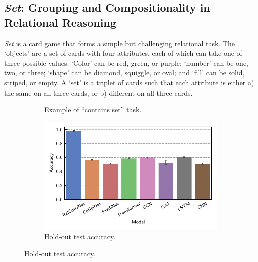\subsection{\textit{Set}: Grouping and Compositionality in Relational Reasoning}\label{ssec:experiments_set}

\textit{Set} is a card game that forms a simple but challenging relational task. The `objects' are a set of cards with four attributes, each of which can take one of three possible values. `Color' can be red, green, or purple; `number' can be one, two, or three; `shape' can be diamond, squiggle, or oval; and `fill' can be solid, striped, or empty. A `set' is a triplet of cards such that each attribute is either a) the same on all three cards, or b) different on all three cards.

\begin{figure}[ht]
    \vskip-10pt
    \centering
    \begin{subfigure}[b]{0.49\textwidth}
        \centering
        \caption{Example of ``contains set'' task.}\label{fig:contains_set_example}
    \end{subfigure}
    \begin{subfigure}[b]{0.5\textwidth}
        \centering
        \includegraphics[width=\textwidth]{figs/experiments/contains_set_acc.pdf}
        \vskip-5pt
        \caption{\footnotesize{Hold-out test accuracy.}}\label{fig:contains_set_acc}
    \end{subfigure}


\end{figure}
